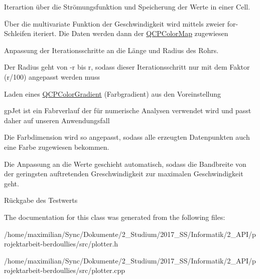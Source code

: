 Iterartion über die Strömungsfunktion und Speicherung der Werte in einer Cell.

Über die multivariate Funktion der Geschwindigkeit wird mittels zweier for-\/\+Schleifen iteriert. Die Daten werden dann der \hyperlink{class_q_c_p_color_map}{Q\+C\+P\+Color\+Map} zugewiesen

Anpassung der Iterationsschritte an die Länge und Radius des Rohrs.

Der Radius geht von -\/r bis r, sodass dieser Iterationsschritt nur mit dem Faktor (r/100) angepasst werden muss

Laden eines \hyperlink{class_q_c_p_color_gradient}{Q\+C\+P\+Color\+Gradient} (Farbgradient) aus den Voreinstellung

gp\+Jet ist ein Fabrverlauf der für numerische Analysen verwendet wird und passt daher auf unseren Anwendungsfall

Die Farbdimension wird so angepasst, sodass alle erzeugten Datenpunkten auch eine Farbe zugewiesen bekommen.

Die Anpassung an die Werte geschieht automatisch, sodass die Bandbreite von der geringsten auftretenden Greschwindigkeit zur maximalen Geschwindigkeit geht.

Rückgabe des Testwerts 

The documentation for this class was generated from the following files\+:\begin{DoxyCompactItemize}
\item 
/home/maximilian/\+Sync/\+Dokumente/2\+\_\+\+Studium/2017\+\_\+\+S\+S/\+Informatik/2\+\_\+\+A\+P\+I/projektarbeit-\/berdoullies/src/plotter.\+h\item 
/home/maximilian/\+Sync/\+Dokumente/2\+\_\+\+Studium/2017\+\_\+\+S\+S/\+Informatik/2\+\_\+\+A\+P\+I/projektarbeit-\/berdoullies/src/plotter.\+cpp\end{DoxyCompactItemize}
